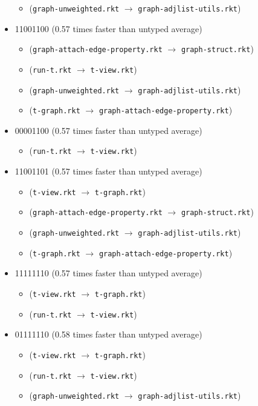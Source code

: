 \documentclass{article}
\newcommand{\mono}[1]{\texttt{#1}}
\begin{document}
\begin{itemize}
  \begin{itemize}
  \item (\mono{graph-unweighted.rkt} $\rightarrow$ \mono{graph-adjlist-utils.rkt})
  \end{itemize}
\item 11001100 (0.57 times faster than untyped average)
  \begin{itemize}
  \item (\mono{graph-attach-edge-property.rkt} $\rightarrow$ \mono{graph-struct.rkt})
  \item (\mono{run-t.rkt} $\rightarrow$ \mono{t-view.rkt})
  \item (\mono{graph-unweighted.rkt} $\rightarrow$ \mono{graph-adjlist-utils.rkt})
  \item (\mono{t-graph.rkt} $\rightarrow$ \mono{graph-attach-edge-property.rkt})
  \end{itemize}
\item 00001100 (0.57 times faster than untyped average)
  \begin{itemize}
  \item (\mono{run-t.rkt} $\rightarrow$ \mono{t-view.rkt})
  \end{itemize}
\item 11001101 (0.57 times faster than untyped average)
  \begin{itemize}
  \item (\mono{t-view.rkt} $\rightarrow$ \mono{t-graph.rkt})
  \item (\mono{graph-attach-edge-property.rkt} $\rightarrow$ \mono{graph-struct.rkt})
  \item (\mono{graph-unweighted.rkt} $\rightarrow$ \mono{graph-adjlist-utils.rkt})
  \item (\mono{t-graph.rkt} $\rightarrow$ \mono{graph-attach-edge-property.rkt})
  \end{itemize}
\item 11111110 (0.57 times faster than untyped average)
  \begin{itemize}
  \item (\mono{t-view.rkt} $\rightarrow$ \mono{t-graph.rkt})
  \item (\mono{run-t.rkt} $\rightarrow$ \mono{t-view.rkt})
  \end{itemize}
\item 01111110 (0.58 times faster than untyped average)
  \begin{itemize}
  \item (\mono{t-view.rkt} $\rightarrow$ \mono{t-graph.rkt})
  \item (\mono{run-t.rkt} $\rightarrow$ \mono{t-view.rkt})
  \item (\mono{graph-unweighted.rkt} $\rightarrow$ \mono{graph-adjlist-utils.rkt})
  \end{itemize}
\end{itemize}
\end{document}
